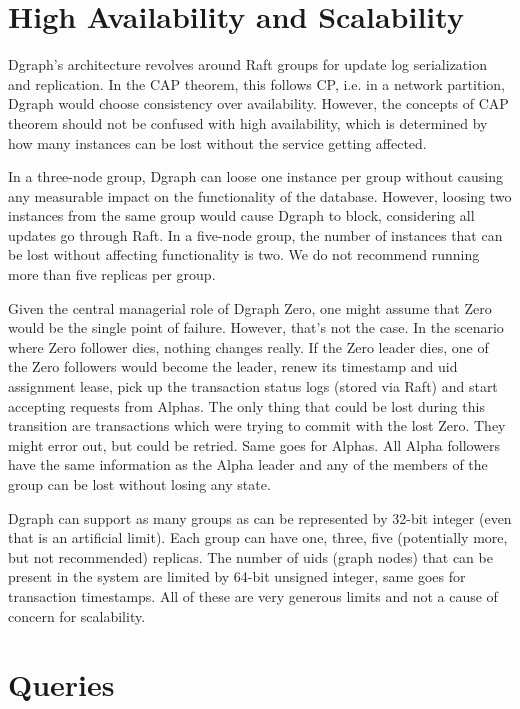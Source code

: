\documentclass[letterpaper,twocolumn,10pt]{article}
\begin{document}
\section{High Availability and Scalability}

Dgraph's architecture revolves around Raft groups for update log serialization
and replication. In the CAP theorem, this follows CP, i.e. in a network
partition, Dgraph would choose consistency over availability. However, the
concepts of CAP theorem should not be confused with high availability, which is
determined by how many instances can be lost without the service getting
affected.

In a three-node group, Dgraph can loose one instance per group without causing
any measurable impact on the functionality of the database. However, loosing two
instances from the same group would cause Dgraph to block, considering all
updates go through Raft. In a five-node group, the number of instances that can
be lost without affecting functionality is two. We do not recommend running more
than five replicas per group.

Given the central managerial role of Dgraph Zero, one might assume that Zero
would be the single point of failure. However, that's not the case. In the
scenario where Zero follower dies, nothing changes really. If the Zero leader
dies, one of the Zero followers would become the leader, renew its timestamp and
uid assignment lease, pick up the transaction status logs (stored via Raft) and
start accepting requests from Alphas. The only thing that could be lost during
this transition are transactions which were trying to commit with the lost Zero.
They might error out, but could be retried. Same goes for Alphas. All Alpha
followers have the same information as the Alpha leader and any of the members
of the group can be lost without losing any state.

Dgraph can support as many groups as can be represented by 32-bit integer (even
that is an artificial limit). Each group can have one, three, five (potentially
more, but not recommended) replicas. The number of uids (graph nodes) that can
be present in the system are limited by 64-bit unsigned integer, same goes for
transaction timestamps. All of these are very generous limits and not a cause of
concern for scalability.

\section{Queries}
\end{document}
